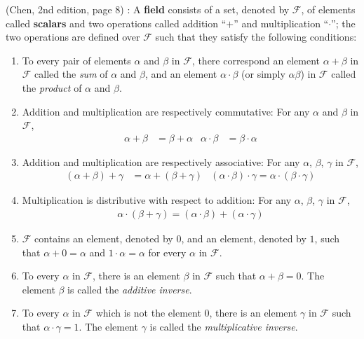 \begin{definition} (Chen, 2nd edition, page 8) : A \textbf{field} consists of a set, denoted by $\mathcal{F}$, of elements called \textbf{scalars} and two operations called addition ``$+$'' and multiplication ``$\cdot$''; the two operations are defined over $\mathcal{F}$ such that they satisfy the following conditions:
    \begin{enumerate}
        \item To every pair of elements $\alpha$ and $\beta$ in $\mathcal{F}$, there correspond an element $\alpha+\beta$ in $\mathcal{F}$ called the \emph{sum} of $\alpha$ and $\beta$, and an element $\alpha \cdot \beta$ (or simply $\alpha \beta$) in $\mathcal{F}$ called the \emph{product} of $\alpha$ and $\beta$.
        \item Addition and multiplication are respectively commutative: For any $\alpha$ and $\beta$ in $\mathcal{F}$,
        \begin{align*}
            \alpha+\beta &= \beta + \alpha & \alpha\cdot\beta &= \beta\cdot\alpha
        \end{align*}
        \item Addition and multiplication are respectively associative: For any $\alpha$, $\beta$, $\gamma$ in $\mathcal{F}$,
        \begin{align*}
            \left(\alpha+\beta\right)+\gamma &= \alpha + \left(\beta+\gamma\right) & \left(\alpha\cdot\beta\right)\cdot\gamma = \alpha\cdot\left(\beta\cdot\gamma\right)
        \end{align*}
        \item Multiplication is distributive with respect to addition: For any $\alpha$, $\beta$, $\gamma$ in $\mathcal{F}$,
        \begin{align*}
            \alpha\cdot\left(\beta+\gamma\right) = \left(\alpha\cdot\beta\right)+\left(\alpha\cdot\gamma\right)
        \end{align*}
        \item $\mathcal{F}$ contains an element, denoted by $0$, and an element, denoted by $1$, such that $\alpha + 0 = \alpha$ and $1\cdot\alpha = \alpha$ for every $\alpha$ in $\mathcal{F}$.
        \item To every $\alpha$ in $\mathcal{F}$, there is an element $\beta$ in $\mathcal{F}$ such that $\alpha+\beta = 0$. The element $\beta$ is called the \emph{additive inverse}.
        \item To every $\alpha$ in $\mathcal{F}$ which is not the element 0, there is an element $\gamma$ in $\mathcal{F}$ such that $\alpha\cdot\gamma = 1$. The element $\gamma$ is called the \emph{multiplicative inverse}.
    \end{enumerate}
\end{definition}

